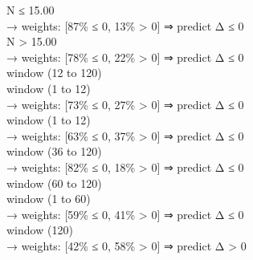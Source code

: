 \begin{flushleft}
\quad \quad \quad N ≤ 15.00 \\
\quad \quad \quad \quad → weights: [87\% ≤ 0, 13\% > 0] ⇒ predict Δ ≤ 0 \\
\quad \quad \quad N > 15.00 \\
\quad \quad \quad \quad → weights: [78\% ≤ 0, 22\% > 0] ⇒ predict Δ ≤ 0 \\
\quad \quad window (12 to 120) \\
\quad \quad \quad window (1 to 12) \\
\quad \quad \quad \quad → weights: [73\% ≤ 0, 27\% > 0] ⇒ predict Δ ≤ 0 \\
\quad \quad \quad window (1 to 12) \\
\quad \quad \quad \quad → weights: [63\% ≤ 0, 37\% > 0] ⇒ predict Δ ≤ 0 \\
\quad \quad \quad window (36 to 120) \\
\quad \quad \quad \quad → weights: [82\% ≤ 0, 18\% > 0] ⇒ predict Δ ≤ 0 \\
\quad window (60 to 120) \\
\quad \quad window (1 to 60) \\
\quad \quad \quad \quad → weights: [59\% ≤ 0, 41\% > 0] ⇒ predict Δ ≤ 0 \\
\quad \quad window (120) \\
\quad \quad \quad \quad → weights: [42\% ≤ 0, 58\% > 0] ⇒ predict Δ > 0 \\
\end{flushleft}
